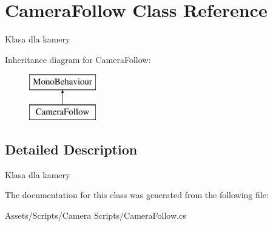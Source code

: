 \hypertarget{class_camera_follow}{}\section{Camera\+Follow Class Reference}
\label{class_camera_follow}


Klasa dla kamery  


Inheritance diagram for Camera\+Follow\+:\begin{figure}[H]
\begin{center}
\leavevmode
\includegraphics[height=2.000000cm]{class_camera_follow}
\end{center}
\end{figure}


\subsection{Detailed Description}
Klasa dla kamery 



The documentation for this class was generated from the following file\+:\begin{DoxyCompactItemize}
\item 
Assets/\+Scripts/\+Camera Scripts/Camera\+Follow.\+cs\end{DoxyCompactItemize}
